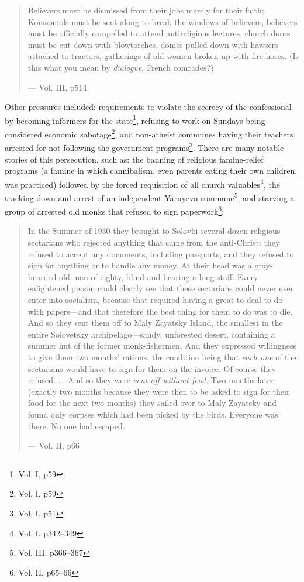 \documentclass{article}
\begin{document}
\begin{quote}
Believers must be dismissed from their jobs merely for their faith; Komsomols must be sent along to break the windows of believers; believers must be officially compelled to attend antireligious lectures, church doors must be cut down with blowtorches, domes pulled down with hawsers attached to tractors, gatherings of old women broken up with fire hoses.  (Is this what you mean by \emph{dialogue}, French comrades?)

--- Vol. III, p514
\end{quote}

Other pressures included: requirements to violate the secrecy of the confessional by becoming informers for the state\footnote{Vol. I, p59}, refusing to work on Sundays being considered economic sabotage\footnote{Vol. I, p59}, and non-atheist communes having their teachers arrested for not following the government programs\footnote{Vol. I, p51}.  There are many notable stories of this persecution, such as: the banning of religious famine-relief programs (a famine in which cannibalism, even parents eating their own children, was practiced) followed by the forced requisition of all church valuables\footnote{Vol. I, p342--349}, the tracking down and arrest of an independent Yaruyevo commune\footnote{Vol. III, p366--367}, and starving a group of arrested old monks that refused to sign paperwork\footnote{Vol. II, p65--66}:

\begin{quote}
In the Summer of 1930 they brought to Solovki several dozen religious sectarians who rejected anything that came from the anti-Christ: they refused to accept any documents, including passports, and they refused to sign for anything or to handle any money.  At their head was a gray-bearded old man of eighty, blind and bearing a long staff.  Every enlightened person could clearly see that these sectarians could never ever enter into socialism, because that required having a great to deal to do with papers---and that therefore the best thing for them to do was to die.  And so they sent them off to Maly Zayatsky Island, the smallest in the entire Solovetsky archipelago---sandy, unforested desert, containing a summer hut of the former monk-fishermen.  And they expressed willingness to give them two months' rations, the condition being that \emph{each one} of the sectarians would have to sign for them on the invoice.  Of course they refused. \ldots~And so they were \emph{sent off without food}.  Two months later (exactly two months because they were then to be asked to sign for their food for the next two months) they sailed over to Maly Zayatsky and found only corpses which had been picked by the birds.  Everyone was there.  No one had escaped.

--- Vol. II, p66
\end{quote}
\end{document}
